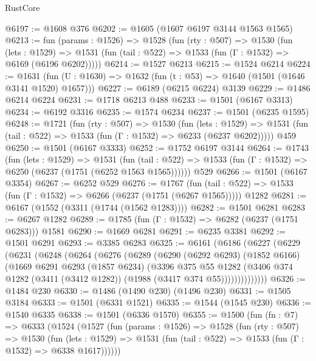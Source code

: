 \begin{lexlean}{RustCore}
\begin{coremodule}
@6197 := @1608 @376
@6202 := @1605 (@1607 @6197 @3144 @1563 @1565)
@6213 := fun (params : @1526) =>
  @1528
    (fun (rty : @507) =>
    @1530
      (fun (lets : @1529) =>
      @1531 (fun (tail : @522) => @1533 (fun (Γ : @1532) => @6169 (@6196 @6202)))))
@6214 := @1527 @6213
@6215 := @1524 @6214
@6224 := @1631 (fun (U : @1630) => @1632 (fun (t : @53) => @1640 (@1501 (@1646 @3141 @1520) @1657)))
@6227 := @6189 (@6215 @6224) @3139
@6229 := @1486 @6214 @6224
@6231 := @1718 @6213 @488
@6233 := @1501 (@6167 @3313)
@6234 := @6192 @3316
@6235 := @1574 @6234
@6237 := @1501 (@6235 @1595)
@6248 := @1721
    (fun (rty : @507) =>
    @1530
      (fun (lets : @1529) =>
      @1531 (fun (tail : @522) => @1533 (fun (Γ : @1532) => @6233 (@6237 @6202)))))
    @459
@6250 := @1501 (@6167 @3333)
@6252 := @1752 @6197 @3144
@6264 := @1743
    (fun (lets : @1529) =>
    @1531
      (fun (tail : @522) => @1533 (fun (Γ : @1532) => @6250 (@6237 (@1751 (@6252 @1563 @1565))))))
    @529
@6266 := @1501 (@6167 @3354)
@6267 := @6252 @529
@6276 := @1767
    (fun (tail : @522) => @1533 (fun (Γ : @1532) => @6266 (@6237 (@1751 (@6267 @1565)))))
    @1282
@6281 := @6167 (@1552 (@3311 (@1744 (@1562 @1283))))
@6282 := @1501 @6281
@6283 := @6267 @1282
@6289 := @1785 (fun (Γ : @1532) => @6282 (@6237 (@1751 @6283))) @1581
@6290 := @1669 @6281
@6291 := @6235 @3381
@6292 := @1501 @6291
@6293 := @3385 @6283
@6325 := @6161
    (@6186
      (@6227
        (@6229
          (@6231
            (@6248
              (@6264
                (@6276
                  (@6289
                    (@6290
                      (@6292 @6293)
                      (@1852 @6166)
                      (@1669
                        @6291
                        @6293
                        (@1857 @6234)
                        (@3396
                          @375
                          @55
                          @1282
                          (@3406
                            @374
                            @1282
                            (@3411 (@3412 @1282))
                            (@1988 (@3417 @374 @55))))))))))))))
@6326 := @1484 @230
@6330 := @1486 (@1490 @230) (@1496 @230)
@6331 := @1505 @3184
@6333 := @1501 (@6331 @1521)
@6335 := @1544 (@1545 @230)
@6336 := @1540 @6335
@6338 := @1501 (@6336 @1570)
@6355 := @1500
    (fun (fn : @7) =>
    @6333
      (@1524
        (@1527
          (fun (params : @1526) =>
          @1528
            (fun (rty : @507) =>
            @1530
              (fun (lets : @1529) =>
              @1531 (fun (tail : @522) => @1533 (fun (Γ : @1532) => @6338 @1617))))))

\end{coremodule}
\end{lexlean}
